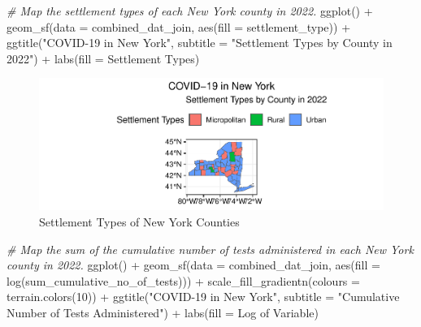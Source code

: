 \documentclass[
  12pt,
]{article}
\newenvironment{Shaded}{\begin{snugshade}}{\end{snugshade}}
\newcommand{\AttributeTok}[1]{\textcolor[rgb]{0.77,0.63,0.00}{#1}}
\newcommand{\CommentTok}[1]{\textcolor[rgb]{0.56,0.35,0.01}{\textit{#1}}}
\newcommand{\DecValTok}[1]{\textcolor[rgb]{0.00,0.00,0.81}{#1}}
\newcommand{\FunctionTok}[1]{\textcolor[rgb]{0.00,0.00,0.00}{#1}}
\newcommand{\NormalTok}[1]{#1}
\newcommand{\SpecialCharTok}[1]{\textcolor[rgb]{0.00,0.00,0.00}{#1}}
\newcommand{\StringTok}[1]{\textcolor[rgb]{0.31,0.60,0.02}{#1}}
\begin{document}
\begin{Shaded}
\begin{Highlighting}[]
\CommentTok{\# Map the settlement types of each New York county in 2022.}
\FunctionTok{ggplot}\NormalTok{() }\SpecialCharTok{+}
  \FunctionTok{geom\_sf}\NormalTok{(}\AttributeTok{data =}\NormalTok{ combined\_dat\_join, }\FunctionTok{aes}\NormalTok{(}\AttributeTok{fill =}\NormalTok{ settlement\_type)) }\SpecialCharTok{+}
  \FunctionTok{ggtitle}\NormalTok{(}\StringTok{"COVID{-}19 in New York"}\NormalTok{,}
          \AttributeTok{subtitle =} \StringTok{"Settlement Types by County in 2022"}\NormalTok{) }\SpecialCharTok{+}
  \FunctionTok{labs}\NormalTok{(}\AttributeTok{fill =} \StringTok{\textquotesingle{}Settlement Types\textquotesingle{}}\NormalTok{)}
\end{Highlighting}
\end{Shaded}

\begin{figure}

\includegraphics{EDA_Final_Group_Project_files/figure-latex/unnamed-chunk-16-1} \hfill{}

\caption{Settlement Types of New York Counties}\label{fig:unnamed-chunk-16}
\end{figure}

\begin{Shaded}
\begin{Highlighting}[]
\CommentTok{\# Map the sum of the cumulative number of tests administered in each New York county in 2022.}
\FunctionTok{ggplot}\NormalTok{() }\SpecialCharTok{+}
  \FunctionTok{geom\_sf}\NormalTok{(}\AttributeTok{data =}\NormalTok{ combined\_dat\_join, }\FunctionTok{aes}\NormalTok{(}\AttributeTok{fill =} \FunctionTok{log}\NormalTok{(sum\_cumulative\_no\_of\_tests))) }\SpecialCharTok{+}
  \FunctionTok{scale\_fill\_gradientn}\NormalTok{(}\AttributeTok{colours =} \FunctionTok{terrain.colors}\NormalTok{(}\DecValTok{10}\NormalTok{)) }\SpecialCharTok{+}
  \FunctionTok{ggtitle}\NormalTok{(}\StringTok{"COVID{-}19 in New York"}\NormalTok{,}
          \AttributeTok{subtitle =} \StringTok{"Cumulative Number of Tests Administered"}\NormalTok{) }\SpecialCharTok{+}
  \FunctionTok{labs}\NormalTok{(}\AttributeTok{fill =} \StringTok{\textquotesingle{}Log of Variable\textquotesingle{}}\NormalTok{)}
\end{Highlighting}
\end{Shaded}
\end{document}
